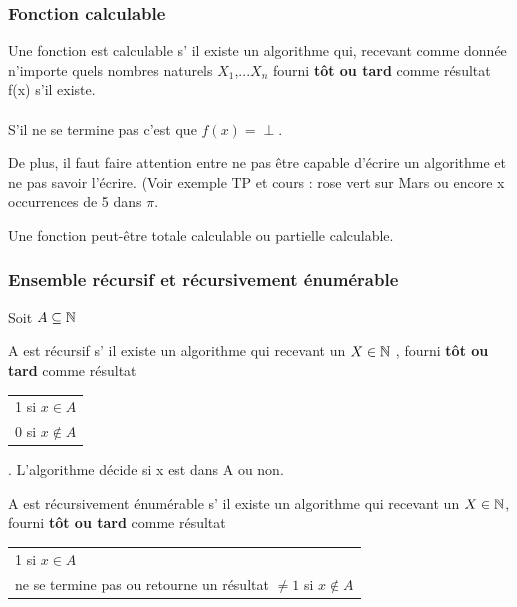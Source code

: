 \subsubsection{Fonction calculable}
\label{ssub:fonction_calculable}
Une fonction est calculable s’ il existe un algorithme qui, recevant comme donnée
n'importe quels nombres naturels $X_1$,...$X_n$ fourni \textbf{tôt ou tard} comme 
résultat f(x) s’il existe.
\paragraph{} S’il ne se termine pas c'est que $f(x)=\perp$. \\

\begin{myrem}
	De plus, il faut faire attention entre ne pas être capable d'écrire un algorithme
	et ne pas savoir l'écrire. (Voir exemple TP et cours : rose vert sur Mars ou encore
	x occurrences de 5 dans $\pi$.
\end{myrem}

\begin{myrem}
	Une fonction peut-être totale calculable ou partielle calculable.
\end{myrem}


\subsubsection{Ensemble récursif et récursivement énumérable}
\label{ssub:ensemble_r_cursif_et_r_cursivement_num_rable}
Soit $A\subseteq \mathbb{N}$

\begin{mydef}
	A est récursif s’ il existe un algorithme qui recevant un $X\in \mathbb{N}$
	, fourni \textbf{tôt ou tard} comme résultat 
	\begin{tabular}{l}
		1 si $x\in A$\\
		0 si $x\notin A$\\
	\end{tabular}
	. L'algorithme décide si x est dans A ou non.
\end{mydef}

\begin{mydef}
	A est récursivement énumérable s’ il existe un algorithme qui recevant
	un $X\in \mathbb{N}$, fourni \textbf{tôt ou tard} comme résultat
	\begin{tabular}{l}
		1 si $x\in A$\\
		 ne se termine pas ou retourne un résultat $\neq1$ si
		 $x\notin A$\\
	\end{tabular}
\end{mydef}

